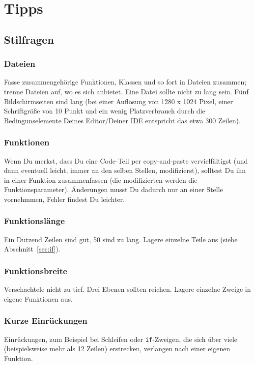 \documentclass[twoside]{scrreprt}
\providecommand{\code}[1]{\texttt{#1}}
\begin{document}
\chapter{Tipps\label{sec:tipps}}
\section{Stilfragen}
\subsection{Dateien}
Fasse zusammengeh\"o{}rige Funktionen, Klassen und so fort in Dateien zusammen; 
trenne Dateien auf, wo es sich anbietet.
Eine Datei sollte nicht zu lang sein. F\"u{}nf Bildschirmseiten sind
lang (bei einer Aufl\"o{}sung von 1280 x 1024 Pixel, einer
Schriftgr\"o{}\ss{}e von 10 Punkt und ein wenig Platzverbrauch durch die
Bedingunselemente Deines Editor/Deiner IDE entspricht das etwa 300
Zeilen).

\subsection{Funktionen}
Wenn Du merkst, dass Du eine Code-Teil per copy-and-paste vervielf\"a{}ltigst
(und dann eventuell leicht, immer an den selben Stellen, modifizierst),
solltest Du ihn in einer Funktion zusammenfassen (die modifizierten werden die
Funktionsparameter). 
\"A{}nderungen musst Du dadurch nur an einer Stelle vornehmmen, Fehler 
findest Du leichter.

\subsection{Funktionsl\"a{}nge} 
Ein Dutzend Zeilen sind gut, 50 sind zu lang.
Lagere einzelne Teile aus (siehe Abschnitt~\ref{sec:if}).

\subsection{Funktionsbreite\label{sec:breite}} 
Verschachtele nicht zu tief. Drei Ebenen sollten reichen. 
Lagere einzelne Zweige in eigene Funktionen aus.

\subsection{Kurze Einr\"u{}ckungen} 
Einr\"u{}ckungen, zum Beispiel bei Schleifen oder \code{if}-Zweigen,
die sich \"u{}ber viele (beispielsweise mehr als 12 Zeilen) erstrecken, 
verlangen nach einer eigenen Funktion.
\end{document}

